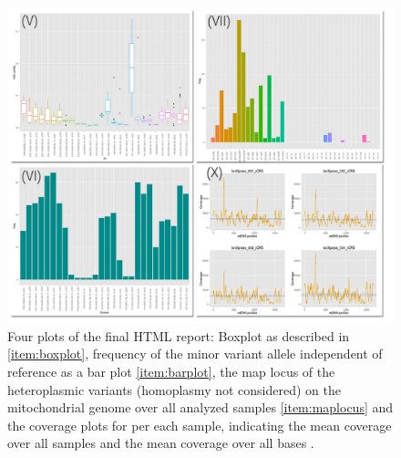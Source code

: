 \begin{figure}[!ht]
    \centering
    \includegraphics[width=1\textwidth]{images/mtdna-server-plots.png}
    \caption[Plots of the final HTML report]{Four plots of the final HTML report: Boxplot as described in \ref{item:boxplot}, frequency of the minor variant allele independent of reference as a bar plot \ref{item:barplot}, the map locus of the heteroplasmic variants (homoplasmy not considered) on the mitochondrial genome over all analyzed samples \ref{item:maplocus} and the coverage plots for per each sample, indicating the mean coverage over all samples and the mean coverage over all bases \label{item:coverageplot}.}
    \label{fig:mtdna-server-plots}
\end{figure}
